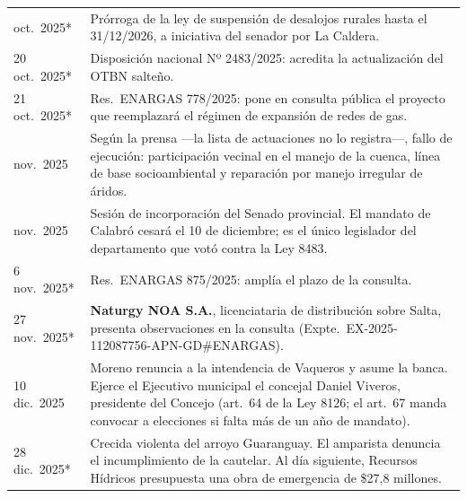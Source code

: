 \begin{longtable}{@{}p{2.7cm}p{10.3cm}@{}}
oct.\ 2025* & Prórroga de la ley de suspensión de desalojos rurales hasta el 31/12/2026, a iniciativa del senador por La Caldera. \\
20 oct.\ 2025* & Disposición nacional Nº 2483/2025: acredita la actualización del OTBN salteño. \\
21 oct.\ 2025* & Res.\ ENARGAS 778/2025: pone en consulta pública el proyecto que reemplazará el régimen de expansión de redes de gas. \\
nov.\ 2025 & Según la prensa ---la lista de actuaciones no lo registra---, fallo de ejecución: participación vecinal en el manejo de la cuenca, línea de base socioambiental y reparación por manejo irregular de áridos. \\
nov.\ 2025 & Sesión de incorporación del Senado provincial. El mandato de Calabró cesará el 10 de diciembre; es el único legislador del departamento que votó contra la Ley 8483. \\
6 nov.\ 2025* & Res.\ ENARGAS 875/2025: amplía el plazo de la consulta. \\
27 nov.\ 2025* & \textbf{Naturgy NOA S.A.}, licenciataria de distribución sobre Salta, presenta observaciones en la consulta (Expte.\ EX-2025-112087756-APN-GD\#ENARGAS). \\
10 dic.\ 2025 & Moreno renuncia a la intendencia de Vaqueros y asume la banca. Ejerce el Ejecutivo municipal el concejal Daniel Viveros, presidente del Concejo (art.\ 64 de la Ley 8126; el art.\ 67 manda convocar a elecciones si falta más de un año de mandato). \\
28 dic.\ 2025* & Crecida violenta del arroyo Guaranguay. El amparista denuncia el incumplimiento de la cautelar. Al día siguiente, Recursos Hídricos presupuesta una obra de emergencia de \$27,8 millones. \\

\end{longtable}
